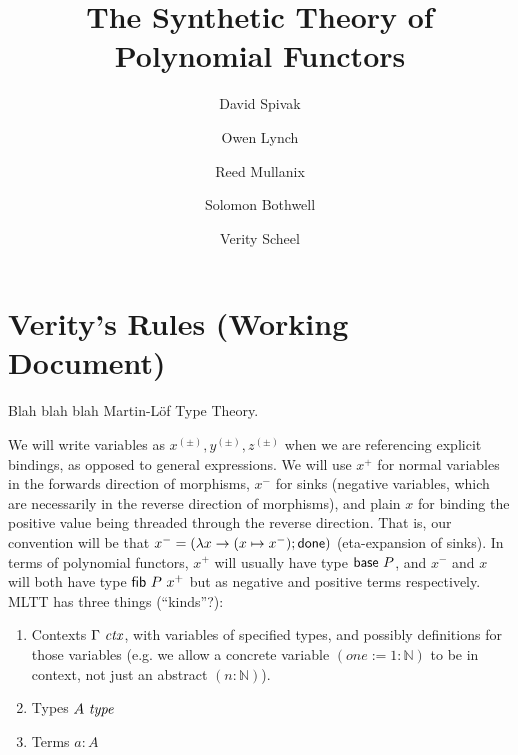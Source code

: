 \documentclass[final]{amsart}
\title{The Synthetic Theory of Polynomial Functors}
\author{David Spivak}
\author{Owen Lynch}
\author{Reed Mullanix}
\author{Solomon Bothwell}
\author{Verity Scheel}
\begin{document}
\maketitle

\section{Verity's Rules (Working Document)}

Blah blah blah Martin-L\"of Type Theory.

We will write variables as $x^{(\pm)}, y^{(\pm)}, z^{(\pm)}$ when we are referencing explicit bindings, as opposed to general expressions.
We will use $x^{+}$ for normal variables in the forwards direction of morphisms, $x^{-}$ for sinks (negative variables, which are necessarily in the reverse direction of morphisms), and plain $x$ for binding the positive value being threaded through the reverse direction.
That is, our convention will be that $x^{-} = (\lambda x \to (x \mapsto x^{-}); \mathsf{done})$ (eta-expansion of sinks).
In terms of polynomial functors, $x^{+}$ will usually have type $\mathsf{base}\ P$, and $x^{-}$ and $x$ will both have type $\mathsf{fib}\ P\ x^{+}$ but as negative and positive terms respectively.\\

MLTT has three things (``kinds''?):
\begin{enumerate}
  \item Contexts $\Gamma\, \operatorname{\mathit{ctx}}$, with variables of specified types, and possibly definitions for those variables (e.g. we allow a concrete variable $(one := 1 : \mathbb{N})$ to be in context, not just an abstract $(n : \mathbb{N})$).
  \item Types $A\, \operatorname{\mathit{type}}$
  \item Terms $a : A$
\end{enumerate}
\end{document}
